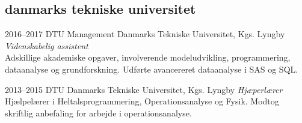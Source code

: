 \documentclass[]{../friggeri-cv} %
\begin{document}
\subsection{danmarks tekniske universitet}

\begin{entrylist}

\entry
{2016--2017}
{DTU Management}
{Danmarks Tekniske Universitet, Kgs. Lyngby}
{\emph{Videnskabelig assistent}\\
Adskillige akademiske opgaver, involverende modeludvikling, programmering, dataanalyse og grundforskning. Udførte avancereret dataanalyse i SAS og SQL.}

\entry
{2013--2015}
{DTU}
{Danmarks Tekniske Universitet, Kgs. Lyngby}
{\emph{Hjæperlærer}\\
Hjælpelærer i Heltalsprogrammering, Operationsanalyse og Fysik. Modtog skriftlig anbefaling for arbejde i operationsanalyse.}

\end{entrylist}



\end{document}
